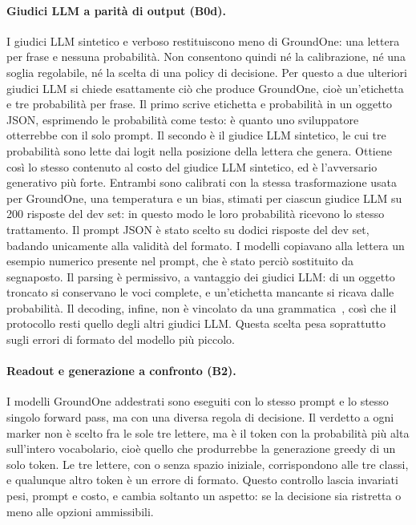 \paragraph{Giudici LLM a parità di output (B0d).} I giudici LLM sintetico e verboso restituiscono meno di GroundOne: una lettera
per frase e nessuna probabilità. Non consentono quindi né la calibrazione, né una soglia regolabile, né la scelta di una
policy di decisione. Per questo a due ulteriori giudici LLM si chiede esattamente ciò che produce GroundOne, cioè
un'etichetta e tre probabilità per frase. Il primo scrive etichetta e probabilità in un oggetto JSON, esprimendo le
probabilità come testo: è quanto uno sviluppatore otterrebbe con il solo prompt. Il secondo è il giudice LLM sintetico, le
cui tre probabilità sono lette dai logit nella posizione della lettera che genera. Ottiene così lo stesso contenuto al
costo del giudice LLM sintetico, ed è l'avversario generativo più forte. Entrambi sono calibrati con la stessa
trasformazione usata per GroundOne, una temperatura e un bias, stimati per ciascun giudice LLM su 200 risposte del dev set:
in questo modo le loro probabilità ricevono lo stesso trattamento. Il prompt JSON è stato scelto su dodici risposte del
dev set, badando unicamente alla validità del formato. I modelli copiavano alla lettera un esempio numerico presente nel
prompt, che è stato perciò sostituito da segnaposto. Il parsing è permissivo, a vantaggio dei giudici LLM: di un oggetto
troncato si conservano le voci complete, e un'etichetta mancante si ricava dalle probabilità. Il decoding, infine, non è
vincolato da una grammatica~\cite{willard2023outlines}, così che il protocollo resti quello degli altri giudici LLM. Questa
scelta pesa soprattutto sugli errori di formato del modello più piccolo.

\paragraph{Readout e generazione a confronto (B2).} I modelli GroundOne addestrati sono eseguiti con lo stesso prompt e
lo stesso singolo forward pass, ma con una diversa regola di decisione. Il verdetto a ogni marker non è scelto fra le
sole tre lettere, ma è il token con la probabilità più alta sull'intero vocabolario, cioè quello che produrrebbe la
generazione greedy di un solo token. Le tre lettere, con o senza spazio iniziale, corrispondono alle tre classi, e
qualunque altro token è un errore di formato. Questo controllo lascia invariati pesi, prompt e costo, e cambia soltanto
un aspetto: se la decisione sia ristretta o meno alle opzioni ammissibili.

